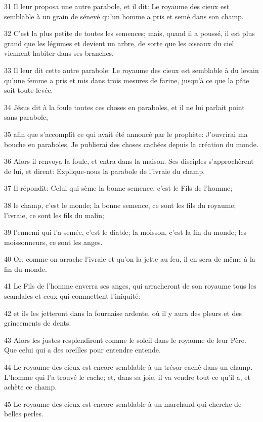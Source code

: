 \par 31 Il leur proposa une autre parabole, et il dit: Le royaume des cieux est semblable à un grain de sénevé qu'un homme a pris et semé dans son champ.
\par 32 C'est la plus petite de toutes les semences; mais, quand il a poussé, il est plus grand que les légumes et devient un arbre, de sorte que les oiseaux du ciel viennent habiter dans ses branches.
\par 33 Il leur dit cette autre parabole: Le royaume des cieux est semblable à du levain qu'une femme a pris et mis dans trois mesures de farine, jusqu'à ce que la pâte soit toute levée.
\par 34 Jésus dit à la foule toutes ces choses en paraboles, et il ne lui parlait point sans parabole,
\par 35 afin que s'accomplît ce qui avait été annoncé par le prophète: J'ouvrirai ma bouche en paraboles, Je publierai des choses cachées depuis la création du monde.
\par 36 Alors il renvoya la foule, et entra dans la maison. Ses disciples s'approchèrent de lui, et dirent: Explique-nous la parabole de l'ivraie du champ.
\par 37 Il répondit: Celui qui sème la bonne semence, c'est le Fils de l'homme;
\par 38 le champ, c'est le monde; la bonne semence, ce sont les fils du royaume; l'ivraie, ce sont les fils du malin;
\par 39 l'ennemi qui l'a semée, c'est le diable; la moisson, c'est la fin du monde; les moissonneurs, ce sont les anges.
\par 40 Or, comme on arrache l'ivraie et qu'on la jette au feu, il en sera de même à la fin du monde.
\par 41 Le Fils de l'homme enverra ses anges, qui arracheront de son royaume tous les scandales et ceux qui commettent l'iniquité:
\par 42 et ils les jetteront dans la fournaise ardente, où il y aura des pleurs et des grincements de dents.
\par 43 Alors les justes resplendiront comme le soleil dans le royaume de leur Père. Que celui qui a des oreilles pour entendre entende.
\par 44 Le royaume des cieux est encore semblable à un trésor caché dans un champ. L'homme qui l'a trouvé le cache; et, dans sa joie, il va vendre tout ce qu'il a, et achète ce champ.
\par 45 Le royaume des cieux est encore semblable à un marchand qui cherche de belles perles.
